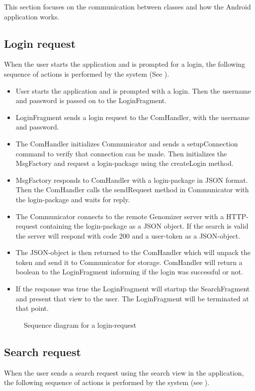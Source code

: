 This section focuses on the communication  between classes and how the Android application works.
\subsection{Login request}
	When the user starts the application and is prompted for a login, the following sequence of actions is performed by the system (See ).
	
	\begin{itemize}
		\item
			User starts the application and is prompted with a login.
			Then the username and password is passed on to the LoginFragment.
		\item
			LoginFragment sends a login request to the ComHandler, with the username and password.
		\item
			The ComHandler initializes Communicator and sends a setupConnection command to verify that connection can be made.
			Then initializes the MsgFactory and request a login-package using the createLogin method.
		\item
			MsgFactory responds to ComHandler with a login-package in JSON format.
			Then the ComHandler calls the sendRequest method in Communicator with the login-package and waits for reply.
		\item
			The Communicator connects to the remote Genomizer server with a HTTP-request containing the login-package as a JSON object.
			If the search is valid the server will respond with code 200 and a user-token as a JSON-object.
		\item
			The JSON-object is then returned to the ComHandler which will unpack the token and send it to Communicator for storage.
			ComHandler will return a boolean to the LoginFragment informing if the login was successful or not.
		\item 
			If the response was true the LoginFragment will startup the SearchFragment and present that view to the user.
			The LoginFragment will be terminated at that point. 
			
	\end{itemize}

	\begin{figure}[h]
		\caption{Sequence diagram for a login-request}
		\label{fig:and_loginseq}
	\end{figure}
	\FloatBarrier
\subsection{Search request}
	When the user sends a search request using the search view in the application, the following sequence of actions is performed by the system
	(see ).
	
